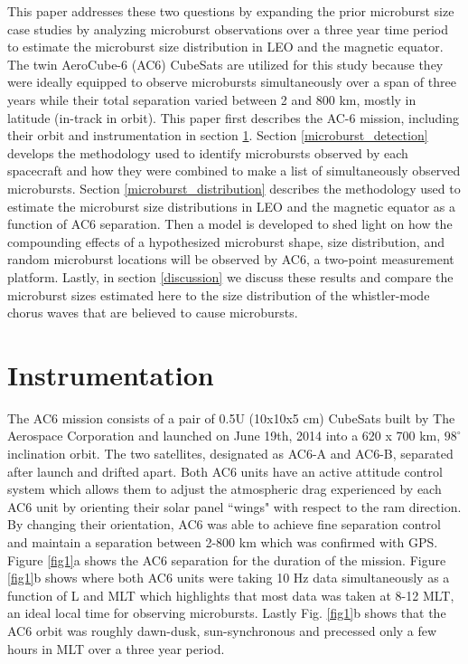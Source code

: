 \documentclass[draft]{agujournal2019}
\begin{document}
This paper addresses these two questions by expanding the prior microburst size case studies by analyzing microburst observations over a three year time period to estimate the microburst size distribution in LEO and the magnetic equator. The twin AeroCube-6 (AC6) CubeSats are utilized for this study because they were ideally equipped to observe microbursts simultaneously over a span of three years while their total separation varied between 2 and 800 km, mostly in latitude (in-track in orbit). This paper first describes the AC-6 mission, including their orbit and instrumentation in section \ref{instrumentation}. Section \ref{microburst_detection} develops the methodology used to identify microbursts observed by each spacecraft and how they were combined to make a list of simultaneously observed microbursts. Section \ref{microburst_distribution} describes the methodology used to estimate the microburst size distributions in LEO and the magnetic equator as a function of AC6 separation. Then a model is developed to shed light on how the compounding effects of a hypothesized microburst shape, size distribution, and random microburst locations will be observed by AC6, a two-point measurement platform. Lastly, in section \ref{discussion} we discuss these results and compare the microburst sizes estimated here to the size distribution of the whistler-mode chorus waves that are believed to cause microbursts. 

\section{Instrumentation} \label{instrumentation}
The AC6 mission consists of a pair of 0.5U (10x10x5 cm) CubeSats built by The Aerospace Corporation and launched on June 19th, 2014 into a 620 x 700 km, $98^\circ$ inclination orbit. The two satellites, designated as AC6-A and AC6-B, separated after launch and drifted apart. Both AC6 units have an active attitude control system which allows them to adjust the atmospheric drag experienced by each AC6 unit by orienting their solar panel ``wings" with respect to the ram direction. By changing their orientation, AC6 was able to achieve fine separation control and maintain a separation between 2-800 km which was confirmed with GPS. Figure \ref{fig1}a shows the AC6 separation for the duration of the mission. Figure \ref{fig1}b shows where both AC6 units were taking 10 Hz data simultaneously as a function of L and MLT which highlights that most data was taken at 8-12 MLT, an ideal local time for observing microbursts. Lastly Fig. \ref{fig1}b shows that the AC6 orbit was roughly dawn-dusk, sun-synchronous and precessed only a few hours in MLT over a three year period.
\end{document}
